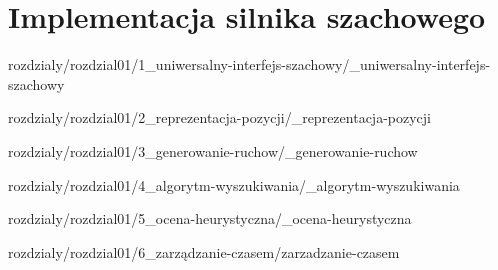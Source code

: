 \chapter {Implementacja silnika szachowego}
\label {ch: implementacja-silnika-szachowego}

 {rozdzialy/rozdzial01/1_uniwersalny-interfejs-szachowy/_uniwersalny-interfejs-szachowy}

 {rozdzialy/rozdzial01/2_reprezentacja-pozycji/_reprezentacja-pozycji}

 {rozdzialy/rozdzial01/3_generowanie-ruchow/_generowanie-ruchow}

 {rozdzialy/rozdzial01/4_algorytm-wyszukiwania/_algorytm-wyszukiwania}

 {rozdzialy/rozdzial01/5_ocena-heurystyczna/_ocena-heurystyczna}

 {rozdzialy/rozdzial01/6_zarządzanie-czasem/zarzadzanie-czasem}